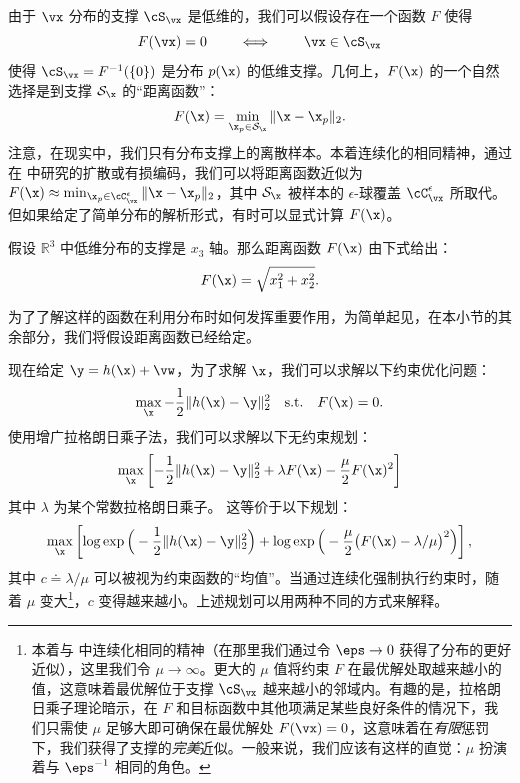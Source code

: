 \documentclass[../../book-main_zh.tex]{subfiles}
\begin{document}
由于 \(\vx\) 分布的支撑 \(\cS_{\vx}\) 是低维的，我们可以假设存在一个函数 \(F\) 使得
\begin{equation}
    F(\vx) = {0} \qquad \iff \qquad \vx \in \cS_{\vx}
\end{equation}
使得 \(\cS_{\vx} = F^{-1}(\{0\})\) 是分布 $p(\x)$ 的低维支撑。几何上，$F(\x)$ 的一个自然选择是到支撑 $\mathcal{S}_{\x}$ 的“距离函数”：
\begin{equation}
    F(\x) = \min_{\x_p \in \mathcal{S}_{\x}} \|\x - \x_p\|_2.
    \label{eqn:F-definition}
\end{equation}
注意，在现实中，我们只有分布支撑上的离散样本。本着连续化的相同精神，通过在  中研究的扩散或有损编码，我们可以将距离函数近似为 $F(\x) \approx \min_{\x_p \in \cC_{\vx}^{\epsilon}} \|\x - \x_p\|_2$，其中 $\mathcal{S}_{\x}$ 被样本的 $\epsilon$-球覆盖 \(\cC_{\vx}^{\epsilon}\) 所取代。但如果给定了简单分布的解析形式，有时可以显式计算 $F(\x)$。
\begin{example}
    假设 $\mathbb{R}^3$ 中低维分布的支撑是 $x_3$ 轴。那么距离函数 $F(\x)$ 由下式给出：
    \begin{equation}
        F(\x) = \sqrt{x_1^2 + x_2^2}.
    \end{equation}
    \label{eg:distance-line}
\end{example}
为了了解这样的函数在利用分布时如何发挥重要作用，为简单起见，在本小节的其余部分，我们将假设距离函数已经给定。

现在给定 $\y = h(\x) +\vw$，为了求解 $\x$，我们可以求解以下约束优化问题：
\begin{equation}
    \max_{\x} - \frac{1}{2}\|h(\x) - \y\|_2^2 \quad \mbox{s.t.} \quad
    F(\x) = {0}.
\end{equation}
使用增广拉格朗日乘子法，我们可以求解以下无约束规划：
\begin{equation}
    \max_{\x} \left[-\frac{1}{2}\|h(\x) - \y\|_2^2  + \lambda F(\x) -
    \frac{\mu}{2} F(\x)^2\right]
\end{equation}
其中 $\lambda$ 为某个常数拉格朗日乘子。
这等价于以下规划：
\begin{equation}\label{eq:lagrange_multiplier_continuation}
    \max_{\x} \left[\log \exp\Big(- \frac{1}{2}\|h(\x) -
        \y\|_2^2\Big) + \log \exp\Big( - \frac{\mu}{2} \big(F(\x) -
    \lambda/\mu\big)^2\Big)\right],
\end{equation}
其中 $c \doteq {\lambda}/{\mu}$ 可以被视为约束函数的“均值”。当通过连续化强制执行约束时，随着 $\mu$ 变大\footnote{本着与  中连续化相同的精神（在那里我们通过令 \(\eps \to 0\) 获得了分布的更好近似），这里我们令 \(\mu \to \infty\)。更大的 \(\mu\) 值将约束 \(F\) 在最优解处取越来越小的值，这意味着最优解位于支撑 \(\cS_{\vx}\) 越来越小的邻域内。有趣的是，拉格朗日乘子理论暗示，在 \(F\) 和目标函数中其他项满足某些良好条件的情况下，我们只需使 \(\mu\) 足够大即可确保在最优解处 \(F(\vx) = 0\)，这意味着在\textit{有限}惩罚下，我们获得了支撑的\textit{完美}近似。一般来说，我们应该有这样的直觉：\(\mu\) 扮演着与 \(\eps^{-1}\) 相同的角色。}，$c$ 变得越来越小。上述规划可以用两种不同的方式来解释。
\end{document}
